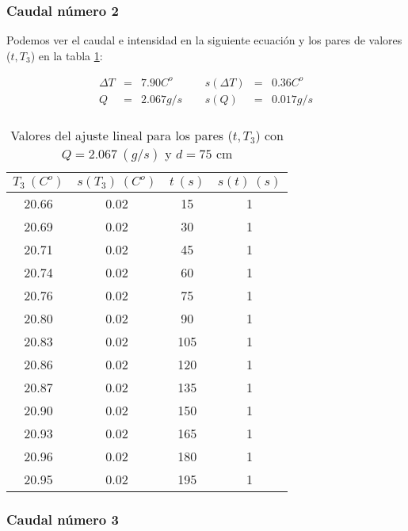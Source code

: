\documentclass[12pt,a4paper]{article}
\begin{document}
 \newpage
 
\subsubsection{Caudal número 2} \label{subsec:2} 
 
Podemos ver el caudal e intensidad en la siguiente ecuación y los pares de valores ($t,T_3$) en la tabla \ref{tab:datoscrudos1}: 
 
\begin{equation} 
\begin{array}{lllllll}
\Delta T & = & 7.90 C^o &  \ \ &  s(\Delta T) & =  & 0.36  C^o \\ 
 Q & = & 2.067 g/s &  \ \ &  s(Q) & =  & 0.017  g/s \\ 
 \end{array} 
\end{equation} 
 
 \begin{table}[h!] 	 \centering 
\begin{tabular}{|c|c|c|c|} 
\hline 
$T_3 \ (C^o)$ & $s(T_3) \ (C^o)$ & $ t \ (s)$ & $s(t) \ (s)$  \\ \hline 
20.66  & 0.02 &  15 & 1 \\ 
\hline
20.69  & 0.02 &  30 & 1 \\ 
\hline
20.71  & 0.02 &  45 & 1 \\ 
\hline
20.74  & 0.02 &  60 & 1 \\ 
\hline
20.76  & 0.02 &  75 & 1 \\ 
\hline
20.80  & 0.02 &  90 & 1 \\ 
\hline
20.83  & 0.02 &  105 & 1 \\ 
\hline
20.86  & 0.02 &  120 & 1 \\ 
\hline
20.87  & 0.02 &  135 & 1 \\ 
\hline
20.90  & 0.02 &  150 & 1 \\ 
\hline
20.93  & 0.02 &  165 & 1 \\ 
\hline
20.96  & 0.02 &  180 & 1 \\ 
\hline
20.95  & 0.02 &  195 & 1 \\ 
\hline
\end{tabular} 
\caption{Valores del ajuste lineal para los pares ($t,T_3$) con $Q=2.067 \ (g/s)$ y $d= 75 $ cm} 
\label{tab:datoscrudos1} 
\end{table} 
 
 \newpage
 
\subsubsection{Caudal número 3} \label{subsec:3} 
 
\end{document}

